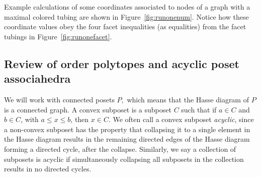 \documentclass{article}
\begin{document}
Example calculations of some coordinates associated to nodes of a graph with a maximal colored tubing are shown in Figure~\ref{fig:runonenum}. Notice how these coordinate values obey the four facet inequalities (as equalities) from the facet tubings in Figure~\ref{fig:runonefacet}.



\subsection{Review of order polytopes and acyclic poset associahedra}\label{rev3}




We will work with connected posets $P,$ which means that the Hasse diagram of $P$ is a connected graph. A convex subposet is a subposet $C$ such that if $a\in C$ and $b\in C$, with $a\le x \le b$, then $x\in C.$ We often call a convex subposet \textit{acyclic}, since a non-convex subposet has the property that collapsing it to a single element in the Hasse diagram results in the remaining directed edges of the Hasse diagram forming a directed cycle, after the collapse. Similarly, we say a collection of subposets is acyclic if simultaneously collapsing all subposets in the collection results in no directed cycles. 
\end{document}

